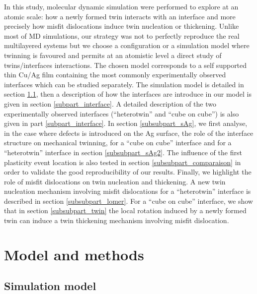 \documentclass[final,3p,times,twocolumn]{elsarticle}
\begin{document}
In this study, molecular dynamic simulation were performed to explore at an atomic scale: how a newly formed twin interacts with an interface and more precisely how misfit dislocations induce twin nucleation or thickening. Unlike most of MD simulations, our strategy was not to perfectly reproduce the real multilayered systems but we choose a configuration or a simulation model where twinning is favoured and permits at an atomistic level a direct study of twins/interfaces interactions. The chosen model corresponds to a self supported thin Cu/Ag film containing the most commonly experimentally observed interfaces which can be studied separately. The simulation model is detailed in section \ref{subpart_model}, then a description of how the interfaces are introduce in our model is given in section \ref{subpart_interface}. A detailed description of the two experimentally observed interfaces (``heterotwin'' and ``cube on cube'') is also given in part \ref{subpart_interface}. In section \ref{subsubpart_sAg}, we first analyse, in the case where defects is introduced on the Ag surface, the role of the interface structure on mechanical twinning, for a ``cube on cube'' interface and for a ``heterotwin'' interface in section \ref{subsubpart_sAg2}. The influence of the first plasticity event location is also tested in section \ref{subsubpart_comparaison} in order to validate the good reproducibility of our results. Finally, we highlight the role of misfit dislocations on twin nucleation and thickening. A new twin nucleation mechanism involving misfit dislocations for a ``heterotwin'' interface is described in section \ref{subsubpart_lomer}. For a ``cube on cube'' interface, we show that in section \ref{subsubpart_twin} the local rotation induced by a newly formed twin can induce a twin thickening mechanism involving misfit dislocation.          

\section{Model and methods}
\label{part_methods}

	\subsection{Simulation model}
	\label{subpart_model}
\end{document}

